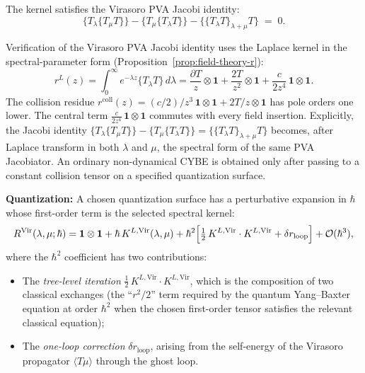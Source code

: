 The kernel satisfies the Virasoro PVA Jacobi identity:
\begin{equation}
\{T_\lambda\{T_\mu T\}\}
-\{T_\mu\{T_\lambda T\}\}
-\{\{T_\lambda T\}_{\lambda+\mu}T\}
\;=\;0.
\end{equation}

\begin{computation}
Verification of the Virasoro PVA Jacobi identity uses the Laplace kernel in the spectral-parameter form
(Proposition~\ref{prop:field-theory-r}):
\[
r^L(z)
= \int_0^\infty e^{-\lambda z} \{T_\lambda T\}\,d\lambda
= \frac{\partial T}{z} \otimes \mathbf{1}
 + \frac{2T}{z^2} \otimes \mathbf{1}
 + \frac{c}{2z^4}\,\mathbf{1}\otimes\mathbf{1}.
\]
The collision residue $r^{\mathrm{coll}}(z) = (c/2)/z^3\,
\mathbf{1}\otimes\mathbf{1} + 2T/z\otimes\mathbf{1}$ has pole
orders one lower.
The central term $\frac{c}{2z^4}\,\mathbf{1}\otimes\mathbf{1}$
commutes with every field insertion.
Explicitly, the Jacobi identity
$\{T_\lambda\{T_\mu T\}\} - \{T_\mu\{T_\lambda T\}\}
= \{\{T_\lambda T\}_{\lambda+\mu} T\}$
becomes, after Laplace transform in both $\lambda$ and $\mu$,
the spectral form of the same PVA Jacobiator. An ordinary
non-dynamical CYBE is obtained only after passing to a constant
collision tensor on a specified quantization surface.
\end{computation}

\textbf{Quantization:} A chosen quantization surface has a
perturbative expansion in $\hbar$ whose first-order term is the
selected spectral kernel:
\begin{equation}
R^{\text{Vir}}(\lambda, \mu; \hbar)
= \mathbf{1} \otimes \mathbf{1}
 + \hbar\, K^{L,\text{Vir}}(\lambda,\mu)
 + \hbar^2 \Bigl[\tfrac{1}{2}\, K^{L,\text{Vir}} \cdot K^{L,\text{Vir}}
 + \delta r_{\text{loop}}\Bigr]
 + \mathcal{O}(\hbar^3),
\end{equation}
where the $\hbar^2$ coefficient has two contributions:
\begin{itemize}
\item The \emph{tree-level iteration}
$\tfrac{1}{2}\,K^{L,\text{Vir}} \cdot K^{L,\text{Vir}}$, which is
the composition of two classical exchanges (the ``$r^2/2$''
term required by the quantum Yang--Baxter equation at order
$\hbar^2$ when the chosen first-order tensor satisfies the relevant
classical equation);
\item The \emph{one-loop correction} $\delta r_{\text{loop}}$,
arising from the self-energy of the Virasoro propagator
$\langle T\mu \rangle$ through the ghost loop.
\end{itemize}

